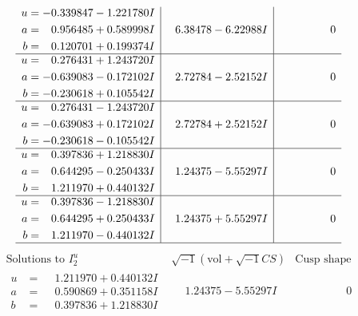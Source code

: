\documentclass[1p]{elsarticle_modified}
\theoremstyle{definition}
\newcommand{\I}{\sqrt{-1}}
\begin{document}
$$\begin{array}{c|c|c}
\begin{aligned}
u &= -0.339847 - 1.221780 I \\
a &= \phantom{-}0.956485 + 0.589998 I \\
b &= \phantom{-}0.120701 + 0.199374 I\end{aligned}
 & \phantom{-}6.38478 - 6.22988 I & \phantom{-0.000000 } 0 \\ \hline\begin{aligned}
u &= \phantom{-}0.276431 + 1.243720 I \\
a &= -0.639083 - 0.172102 I \\
b &= -0.230618 + 0.105542 I\end{aligned}
 & \phantom{-}2.72784 - 2.52152 I & \phantom{-0.000000 } 0 \\ \hline\begin{aligned}
u &= \phantom{-}0.276431 - 1.243720 I \\
a &= -0.639083 + 0.172102 I \\
b &= -0.230618 - 0.105542 I\end{aligned}
 & \phantom{-}2.72784 + 2.52152 I & \phantom{-0.000000 } 0 \\ \hline\begin{aligned}
u &= \phantom{-}0.397836 + 1.218830 I \\
a &= \phantom{-}0.644295 - 0.250433 I \\
b &= \phantom{-}1.211970 + 0.440132 I\end{aligned}
 & \phantom{-}1.24375 - 5.55297 I & \phantom{-0.000000 } 0 \\ \hline\begin{aligned}
u &= \phantom{-}0.397836 - 1.218830 I \\
a &= \phantom{-}0.644295 + 0.250433 I \\
b &= \phantom{-}1.211970 - 0.440132 I\end{aligned}
 & \phantom{-}1.24375 + 5.55297 I & \phantom{-0.000000 } 0\\
 \hline 
 \end{array}$$\newpage$$\begin{array}{c|c|c}  
\text{Solutions to }I^u_{2}& \I (\text{vol} + \sqrt{-1}CS) & \text{Cusp shape}\\
 \hline 
\begin{aligned}
u &= \phantom{-}1.211970 + 0.440132 I \\
a &= \phantom{-}0.590869 + 0.351158 I \\
b &= \phantom{-}0.397836 + 1.218830 I\end{aligned}
 & \phantom{-}1.24375 - 5.55297 I & \phantom{-0.000000 } 0 \\ \hline\begin{aligned}

\end{aligned}
\end{array}$$
\end{document}
